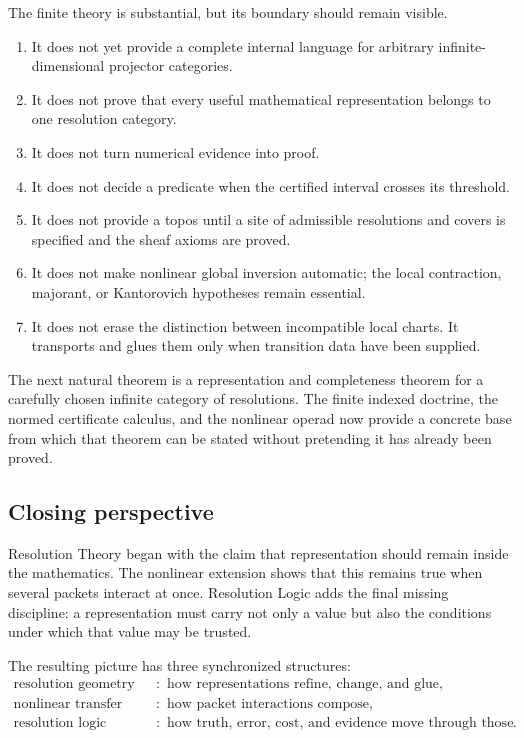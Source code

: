 \documentclass[11pt]{article}
\theoremstyle{definition}
\theoremstyle{remark}
\begin{document}
The finite theory is substantial, but its boundary should remain visible.

\begin{enumerate}[label=\arabic*.]
\item It does not yet provide a complete internal language for arbitrary infinite-dimensional projector categories.
\item It does not prove that every useful mathematical representation belongs to one resolution category.
\item It does not turn numerical evidence into proof.
\item It does not decide a predicate when the certified interval crosses its threshold.
\item It does not provide a topos until a site of admissible resolutions and covers is specified and the sheaf axioms are proved.
\item It does not make nonlinear global inversion automatic; the local contraction, majorant, or Kantorovich hypotheses remain essential.
\item It does not erase the distinction between incompatible local charts.  It transports and glues them only when transition data have been supplied.
\end{enumerate}

The next natural theorem is a representation and completeness theorem for a carefully chosen infinite category of resolutions.  The finite indexed doctrine, the normed certificate calculus, and the nonlinear operad now provide a concrete base from which that theorem can be stated without pretending it has already been proved.

\subsection{Closing perspective}

Resolution Theory began with the claim that representation should remain inside the mathematics.  The nonlinear extension shows that this remains true when several packets interact at once.  Resolution Logic adds the final missing discipline: a representation must carry not only a value but also the conditions under which that value may be trusted.

The resulting picture has three synchronized structures:
\[
\boxed{
\begin{aligned}
\text{resolution geometry}
&:\text{ how representations refine, change, and glue},\\
\text{nonlinear transfer operad}
&:\text{ how packet interactions compose},\\
\text{resolution logic}
&:\text{ how truth, error, cost, and evidence move through those operations}.
\end{aligned}}
\]
\end{document}
